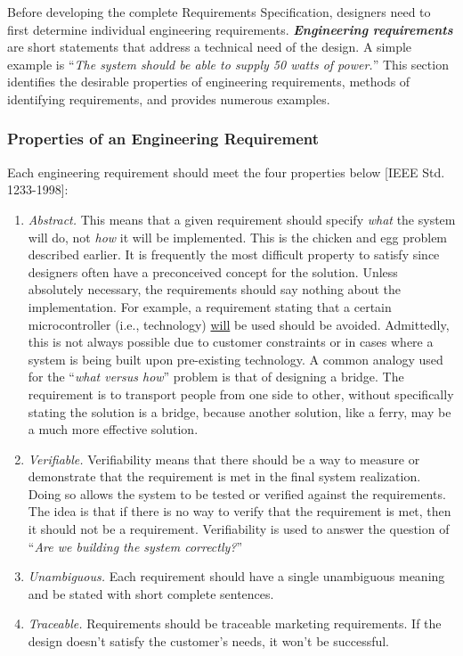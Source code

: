 Before developing the complete Requirements Specification, designers
need to first determine individual engineering requirements.
\emph{\textbf{Engineering requirements}} are short statements that
address a technical need of the design. A simple example is ``\emph{The
system should be able to supply 50 watts of power.}'' This section
identifies the desirable properties of engineering requirements, methods
of identifying requirements, and provides numerous examples.

\subsubsection{Properties of an Engineering
Requirement}\label{properties-of-an-engineering-requirement}

Each engineering requirement should meet the four properties below
{[}IEEE Std. 1233-1998{]}:

\begin{enumerate}
\def\labelenumi{\arabic{enumi})}
\item
  \emph{Abstract.} This means that a given requirement should specify
  \emph{what} the system will do, not \emph{how} it will be implemented.
  This is the chicken and egg problem described earlier. It is
  frequently the most difficult property to satisfy since designers
  often have a preconceived concept for the solution. Unless absolutely
  necessary, the requirements should say nothing about the
  implementation. For example, a requirement stating that a certain
  microcontroller (i.e., technology) \ul{will} be used should be
  avoided. Admittedly, this is not always possible due to customer
  constraints or in cases where a system is being built upon
  pre-existing technology. A common analogy used for the ``\emph{what
  versus how}'' problem is that of designing a bridge. The requirement
  is to transport people from one side to other, without specifically
  stating the solution is a bridge, because another solution, like a
  ferry, may be a much more effective solution.
\item
  \emph{Verifiable.} Verifiability means that there should be a way to
  measure or demonstrate that the requirement is met in the final system
  realization. Doing so allows the system to be tested or verified
  against the requirements. The idea is that if there is no way to
  verify that the requirement is met, then it should not be a
  requirement. Verifiability is used to answer the question of
  ``\emph{Are we building the system correctly?}''
\item
  \emph{Unambiguous.} Each requirement should have a single unambiguous
  meaning and be stated with short complete sentences.
\item
  \emph{Traceable.} Requirements should be traceable marketing
  requirements. If the design doesn't satisfy the customer's needs, it
  won't be successful.
\end{enumerate}

